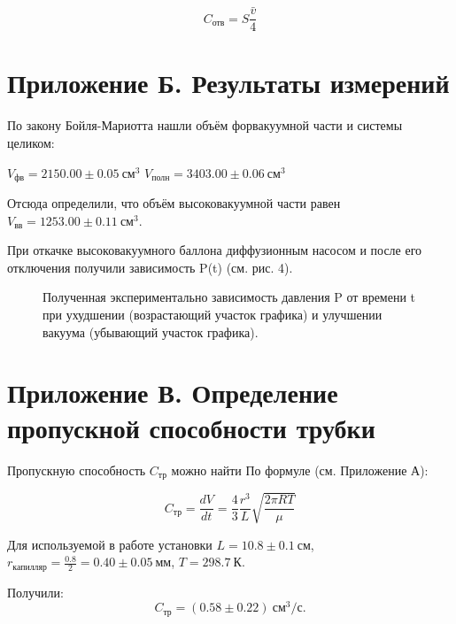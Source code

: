 \begin{equation}
C_\text{отв}=S\frac{\bar v}{4}
\end{equation}

\section{Приложение Б. Результаты измерений}

По закону Бойля-Мариотта нашли объём форвакуумной части и системы целиком:

$V_\text{фв} = 2150.00 \pm 0.05~см^{3}$
$V_\text{полн} = 3403.00 \pm 0.06~см^{3}$

Отсюда определили, что объём высоковакуумной части равен $V_\text{вв} = 1253.00 \pm 0.11 \ \text{см}^3$. 

При откачке высоковакуумного баллона диффузионным насосом и после его отключения получили зависимость P(t) (см. рис. 4).
\begin{figure}[ht]
\center{}  
\vspace{-20pt}
\caption{Полученная экспериментально зависимость давления P от времени t при ухудшении (возрастающий участок графика) и улучшении вакуума (убывающий участок графика).}
\label{fig:dT_p}
\end{figure}

\section{Приложение В. Определение пропускной способности трубки}

Пропускную способность $C_$ можно найти По формуле (см. Приложение А):

\begin{equation*}
    C_\text{тр} = \frac{dV}{dt} = \frac{4}{3}\frac{r^3}{L}\sqrt{\frac{2\pi RT}{\mu}}
\end{equation*}

Для используемой в работе установки $L = 10.8  \ $, $r_ =  = 0.40  \ $, $T = 298.7 \ $.  

Получили:
\begin{equation*}
C_\text{тр} = (0.58 \pm 0.22) \ \text{см}^3/\text{с}.
\end{equation*}

